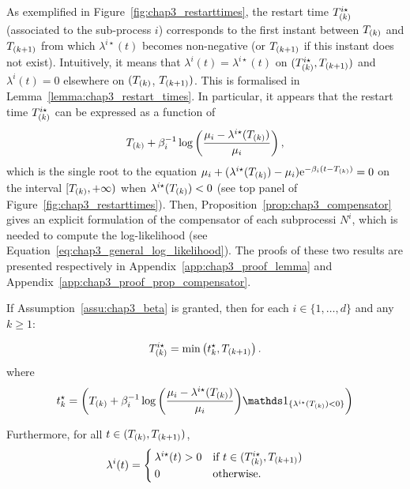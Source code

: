      As exemplified in Figure~\ref{fig:chap3_restarttimes}, the restart time $T\park^{i\star}$ (associated to the sub-process $i$) corresponds to the first instant between $T\park$ and $T\park[k+1]$ from which $\lambda^{i\star}(t)$ becomes non-negative (or $T\park[k+1]$ if this instant does not exist).
    Intuitively, it means that $\lambda^{i}(t) = \lambda^{i\star}(t)$ on $(T\park^{i\star}, T\park[k+1])$ and $\lambda^{i}(t) = 0$ elsewhere on  $(T\park$, $T\park[k+1])$.
    This is formalised in Lemma~\ref{lemma:chap3_restart_times}.
    In particular, it appears that the restart time $T\park^{i\star}$ can be expressed as a function of $$T\park + \beta_i^{-1}\log{\adaptedpar{\frac{\mu_i - \lambda^{i\star}(T\park)}{\mu_i}}}\,,$$
      which is the single root to the equation $\mu_i + (\lambda^{i\star}(T\park) - \mu_i)\mathrm{e}^{-\beta_i(t-T\park)} = 0$ on the interval $[T\park, +\infty)$ when $\lambda^{i\star}(T\park) < 0$ (see top panel of Figure~\ref{fig:chap3_restarttimes}).
      Then, Proposition~\ref{prop:chap3_compensator} gives an explicit formulation of the compensator of each subprocessi \(N^i\), which is needed to compute the log-likelihood (see Equation~\eqref{eq:chap3_general_log_likelihood}).
      The proofs of these two results are presented respectively in Appendix~\ref{app:chap3_proof_lemma} and Appendix~\ref{app:chap3_proof_prop_compensator}.

    \begin{lemma}\label{lemma:chap3_restart_times}
    If Assumption~\ref{assu:chap3_beta} is granted, then for each $i\in\{1,\ldots, d\}$ and any $k\geq1$: 

    \begin{equation}\label{eq:chap3_restart_times_exponential}
        T\park^{i\star} = \min{\adaptedpar{t^\star_k, T\park[k+1]}}\,.
    \end{equation}
    where
    \[t^\star_k = \adaptedpar{T\park + \beta_i^{-1}\log{\adaptedpar{\frac{\mu_i - \lambda^{i\star}(T\park)}{\mu_i}}}\II_{\{\lambda^{i\star}(T\park) < 0\}}}\]

    Furthermore,
    for all \(t \in (T\park, T\park[k+1])\),
    \[
      \lambda^i(t) =
      \begin{cases}
        \lambda^{i\star}(t) > 0 & \text{if } t \in (T\park^{i\star}, T\park[k+1])\\
        0 & \text{otherwise}.
      \end{cases}
    \]
    \end{lemma}

